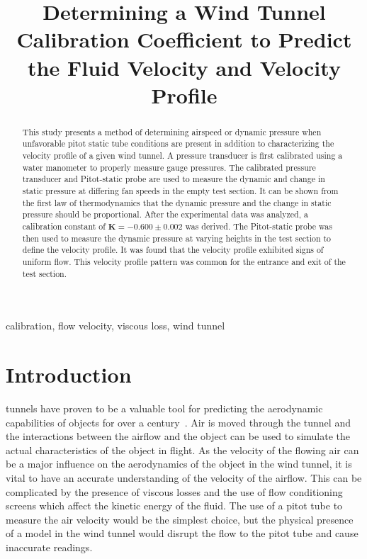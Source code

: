 \documentclass[journal,letterpaper]{IEEEtran}
\begin{document}
\title{Determining a Wind Tunnel Calibration Coefficient to Predict the Fluid Velocity and Velocity Profile}

\author{
}

\maketitle
\thispagestyle{empty}

\begin{abstract}
This study presents a method of determining airspeed or dynamic pressure when unfavorable pitot static tube conditions are present in addition to characterizing the velocity profile of a given wind tunnel.
A pressure transducer is first calibrated using a water manometer to properly measure gauge pressures.
The calibrated pressure transducer and Pitot-static probe are used to measure the dynamic and change in static pressure at differing fan speeds in the empty test section.
It can be shown from the first law of thermodynamics that the dynamic pressure and the change in static pressure should be proportional.
After the experimental data was analyzed, a calibration constant of $\bm{K = -0.600 \pm 0.002}$ was derived.
The Pitot-static probe was then used to measure the dynamic pressure at varying heights in the test section to define the velocity profile.
It was found that the velocity profile exhibited signs of uniform flow.
This velocity profile pattern was common for the entrance and exit of the test section.
\end{abstract}

\begin{IEEEkeywords}
calibration, flow velocity, viscous loss, wind tunnel
\end{IEEEkeywords}


\section{Introduction}


 tunnels have proven to be a valuable tool for predicting the aerodynamic capabilities of objects for over a century~\cite{lecture}.
Air is moved through the tunnel and the interactions between the airflow and the object can be used to simulate the actual characteristics of the object in flight.
As the velocity of the flowing air can be a major influence on the aerodynamics of the object in the wind tunnel, it is vital to have an accurate understanding of the velocity of the airflow.
This can be complicated by the presence of viscous losses and the use of flow conditioning screens which affect the kinetic energy of the fluid.
The use of a pitot tube to measure the air velocity would be the simplest choice, but the physical presence of a model in the wind tunnel would disrupt the flow to the pitot tube and cause inaccurate readings.
\end{document}
